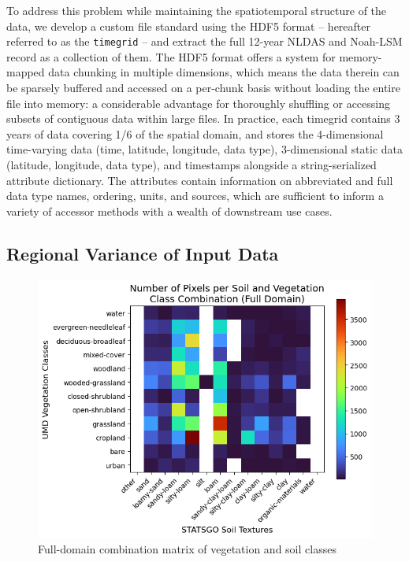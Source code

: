 To address this problem while maintaining the spatiotemporal structure of the data, we develop a custom file standard using the HDF5 format -- hereafter referred to as the \texttt{timegrid} -- and extract the full 12-year NLDAS and Noah-LSM record as a collection of them. The HDF5 format offers a system for memory-mapped data chunking in multiple dimensions, which means the data therein can be sparsely buffered and accessed on a per-chunk basis without loading the entire file into memory: a considerable advantage for thoroughly shuffling or accessing subsets of contiguous data within large files. In practice, each timegrid contains 3 years of data covering 1/6 of the spatial domain, and stores the 4-dimensional time-varying data (time, latitude, longitude, data type), 3-dimensional static data (latitude, longitude, data type), and timestamps alongside a string-serialized attribute dictionary. The attributes contain information on abbreviated and full data type names, ordering, units, and sources, which are sufficient to inform a variety of accessor methods with a wealth of downstream use cases.

\subsection{Regional Variance of Input Data}

\begin{figure}[h!]
    \centering
    \includegraphics[width=.75\linewidth,draft=false]{figures/static_soil-veg-combos.png}
    \caption{Full-domain combination matrix of vegetation and soil classes}
    \label{static-combos}
\end{figure}

